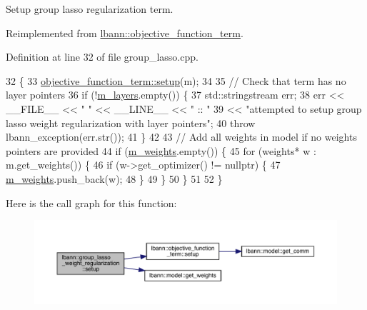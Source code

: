 Setup group lasso regularization term. 

Reimplemented from \hyperlink{classlbann_1_1objective__function__term_a6c8dbdf18aac8676098189fb7b178e91}{lbann\+::objective\+\_\+function\+\_\+term}.



Definition at line 32 of file group\+\_\+lasso.\+cpp.


\begin{DoxyCode}
32                                                       \{
33   \hyperlink{classlbann_1_1objective__function__term_a6c8dbdf18aac8676098189fb7b178e91}{objective\_function\_term::setup}(m);
34 
35   \textcolor{comment}{// Check that term has no layer pointers}
36   \textcolor{keywordflow}{if} (!\hyperlink{classlbann_1_1objective__function__term_a9269cf0a237eacd1e220ba2739f44334}{m\_layers}.empty()) \{
37     std::stringstream err;
38     err << \_\_FILE\_\_ << \textcolor{stringliteral}{" "} << \_\_LINE\_\_ << \textcolor{stringliteral}{" :: "}
39         << \textcolor{stringliteral}{"attempted to setup group lasso weight regularization with layer pointers"};
40     \textcolor{keywordflow}{throw} lbann\_exception(err.str());
41   \}
42 
43   \textcolor{comment}{// Add all weights in model if no weights pointers are provided}
44   \textcolor{keywordflow}{if} (\hyperlink{classlbann_1_1objective__function__term_a1d601c29153ae9cb54c585887608f2bf}{m\_weights}.empty()) \{
45     \textcolor{keywordflow}{for} (weights* w : m.get\_weights()) \{
46       \textcolor{keywordflow}{if} (w->get\_optimizer() != \textcolor{keyword}{nullptr}) \{
47         \hyperlink{classlbann_1_1objective__function__term_a1d601c29153ae9cb54c585887608f2bf}{m\_weights}.push\_back(w);
48       \}
49     \}
50   \}
51 
52 \}
\end{DoxyCode}
Here is the call graph for this function\+:\nopagebreak
\begin{figure}[H]
\begin{center}
\leavevmode
\includegraphics[width=350pt]{classlbann_1_1group__lasso__weight__regularization_af413161b1feefa3bb472079635547c57_cgraph}
\end{center}
\end{figure}
